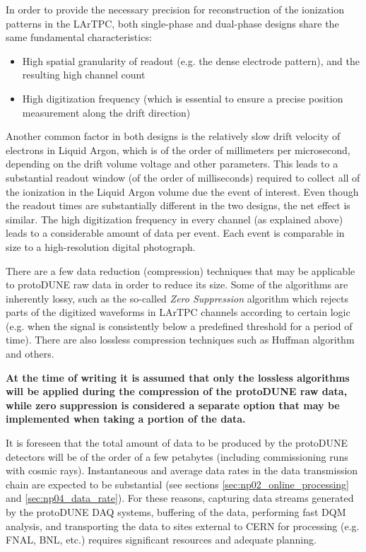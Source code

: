 \documentclass[12pt]{article}
\newcommand{\pd}{protoDUNE\xspace}
\begin{document}
In order to provide the necessary precision for reconstruction of the ionization patterns in the LArTPC, both single-phase and dual-phase designs share the same fundamental characteristics:
\begin{itemize}
\item High spatial granularity of readout (e.g. the dense electrode pattern), and the resulting high channel count
\item High digitization frequency (which is essential to ensure a precise position measurement along the drift direction)
\end{itemize}

\noindent
Another common factor in both designs is the relatively slow drift velocity of electrons in Liquid Argon, which is of the order of millimeters per microsecond,
depending on the drift volume voltage and other parameters. This leads to a substantial readout window (of the order of milliseconds) required to collect
all of the ionization in the Liquid Argon volume due the event of interest. Even though the readout times are substantially different in the two designs,
the net effect is similar. The high digitization frequency in every channel (as explained above) leads to a considerable amount of data per event.
 Each event is comparable in size to a high-resolution digital photograph.

There are a few data reduction (compression) techniques that may be applicable to \pd raw data in order to reduce its size. Some of the algorithms
are inherently lossy, such as the so-called \textit{Zero Suppression} algorithm which rejects parts of the digitized waveforms in LArTPC channels according
to certain logic (e.g. when the signal is consistently below a predefined threshold for a period of time). There are also lossless compression
techniques such as Huffman algorithm and others.

\textbf{At the time of writing it is assumed that only the lossless algorithms will be applied during the compression
of the \pd raw data, while zero suppression is considered a separate option that may be implemented when taking a portion of the data.}

It is foreseen that the total amount of data to be produced by the \pd detectors will be of the order of a few
petabytes (including commissioning runs with cosmic rays). Instantaneous and average data rates in the data transmission chain are expected to be
substantial (see sections \ref{sec:np02_online_processing} and \ref{sec:np04_data_rate}).
For these reasons, capturing data streams generated by the protoDUNE DAQ systems, buffering of the data, performing fast DQM analysis,
and transporting the data to sites external to CERN for processing (e.g. FNAL, BNL, etc.) requires significant resources and adequate planning.
\end{document}
